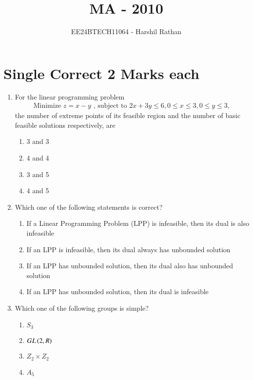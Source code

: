\documentclass[journal]{IEEEtran}
\begin{document}

\vspace{3cm}

\title{MA - 2010}
\author{EE24BTECH11064 - Harshil Rathan}
\maketitle

\renewcommand{\thefigure}{\theenumi}
\renewcommand{\thetable}{\theenumi}

\section*{Single Correct 2 Marks each}
\begin{enumerate}
\item For the linear programming problem
\begin{align*}
    \text{Minimize } z = x - y \text{ , subject to } 2x + 3y \leq 6, 0 \leq x \leq 3, 0 \leq y \leq 3,
\end{align*}
the number of extreme points of its feasible region and the number of basic feasible solutions respectively, are
\begin{multicols}{2}
    \begin{enumerate}
        \item 3 and 3
        \item 4 and 4 
        \item 3 and 5
        \item 4 and 5
    \end{enumerate}
\end{multicols}

\item Which one of the following statements is correct?
\begin{multicols}
    \begin{enumerate}
        \item If a Linear Programming Problem (LPP) is infeasible, then its dual is also infeasible
        \item If an LPP is infeasible, then its dual always has unbounded solution
        \item If an LPP has unbounded solution, then its dual also has unbounded solution
        \item If an LPP has unbounded solution, then its dual is infeasible
    \end{enumerate}
\end{multicols}

\item Which one of the following groups is simple?
\begin{multicols}
    \begin{enumerate}
        \item $S_3$
        \item $GL\left(2,R\right)$
        \item $Z_2 \times Z_2$
        \item $A_5$
    \end{enumerate}
\end{multicols}


\end{enumerate}
\end{document}
